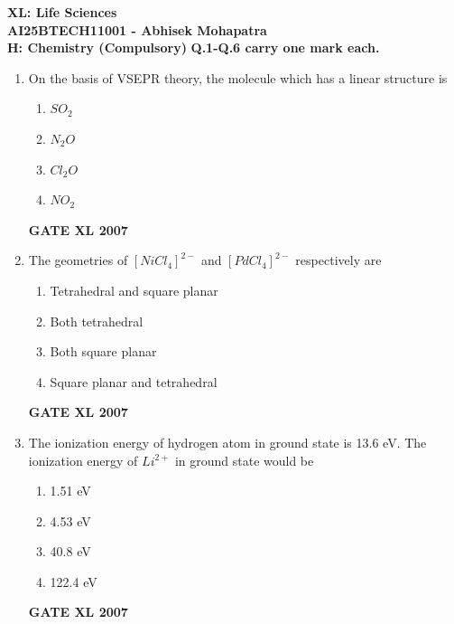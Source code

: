 \documentclass[journal,12pt,onecolumn]{IEEEtran}
\begin{document}
\begin{center}
\textbf{\Large XL: Life Sciences} \\
\textbf{\large AI25BTECH11001 - Abhisek Mohapatra} \\
\textbf{H: Chemistry (Compulsory)}
\textbf{Q.1-Q.6 carry one mark each.}
\end{center}

\begin{enumerate}
    \item On the basis of VSEPR theory, the molecule which has a linear structure is 
    \begin{multicols}{4}
        \begin{enumerate}
            \item $SO_{2}$ 
            \item $N_{2}O$ 
            \item $Cl_{2}O$ 
            \item $NO_{2}$ 
        \end{enumerate}
    \end{multicols}
	    \hfill \textbf{GATE XL 2007}%

    \item The geometries of $[NiCl_{4}]^{2-}$ and $[PdCl_{4}]^{2-}$ respectively are 
        \begin{enumerate}
	\item Tetrahedral and square planar
            \item Both tetrahedral
            \item Both square planar
            \item Square planar and tetrahedral
        \end{enumerate}
	    \hfill \textbf{GATE XL 2007}%

    \item The ionization energy of hydrogen atom in ground state is 13.6 eV. The ionization energy of $Li^{2+}$ in ground state would be 
    \begin{multicols}{4}
        \begin{enumerate}
            \item 1.51 eV
            \item 4.53 eV
            \item 40.8 eV
            \item 122.4 eV
        \end{enumerate}
    \end{multicols}
	    \hfill \textbf{GATE XL 2007}%


\end{enumerate}
\end{document}
